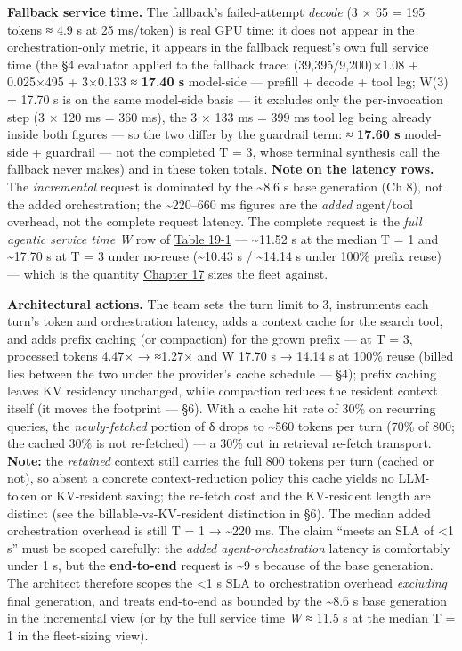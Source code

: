 \textbf{Fallback service time.} The fallback's failed-attempt
\emph{decode} (3 × 65 = 195 tokens ≈ 4.9 s at 25 ms/token) is real GPU
time: it does not appear in the orchestration-only metric, it appears in
the fallback request's own full service time (the §4 evaluator applied
to the fallback trace: (39,395/9,200)×1.08 + 0.025×495 + 3×0.133 ≈
\textbf{17.40 s} model-side --- prefill + decode + tool leg; W(3) =
17.70 s is on the same model-side basis --- it excludes only the
per-invocation step (3 × 120 ms = 360 ms), the 3 × 133 ms = 399 ms tool
leg being already inside both figures --- so the two differ by the
guardrail term: ≈ \textbf{17.60 s} model-side + guardrail --- not the
completed T = 3, whose terminal synthesis call the fallback never makes)
and in these token totals. \textbf{Note on the latency rows.} The
\emph{incremental} request is dominated by the \textasciitilde8.6 s base
generation (Ch 8), not the added orchestration; the
\textasciitilde220--660 ms figures are the \emph{added} agent/tool
overhead, not the complete request latency. The complete request is the
\emph{full agentic service time W} row of \hyperref[tab:19.1]{Table 19-1} ---
\textasciitilde11.52 s at the median T = 1 and \textasciitilde17.70 s at
T = 3 under no-reuse (\textasciitilde10.43 s / \textasciitilde14.14 s
under 100\% prefix reuse) --- which is the quantity \hyperref[chap:17]{Chapter 17} sizes the
fleet against.

\textbf{Architectural actions.} The team sets the turn limit to 3,
instruments each turn's token and orchestration latency, adds a context
cache for the search tool, and adds prefix caching (or compaction) for
the grown prefix --- at T = 3, processed tokens 4.47× → ≈1.27× and W
17.70 s → 14.14 s at 100\% reuse (billed lies between the two under the
provider's cache schedule --- §4); prefix caching leaves KV residency
unchanged, while compaction reduces the resident context itself (it
moves the footprint --- §6). With a cache hit rate of 30\% on recurring
queries, the \emph{newly-fetched} portion of δ drops to
\textasciitilde560 tokens per turn (70\% of 800; the cached 30\% is not
re-fetched) --- a 30\% cut in retrieval re-fetch transport.
\textbf{Note:} the \emph{retained} context still carries the full 800
tokens per turn (cached or not), so absent a concrete context-reduction
policy this cache yields no LLM-token or KV-resident saving; the
re-fetch cost and the KV-resident length are distinct (see the
billable-vs-KV-resident distinction in §6). The median added
orchestration overhead is still T = 1 → \textasciitilde220 ms. The claim
``meets an SLA of \textless1 s'' must be scoped carefully: the
\emph{added agent-orchestration} latency is comfortably under 1 s, but
the \textbf{end-to-end} request is \textasciitilde9 s because of the
base generation. The architect therefore scopes the \textless1 s SLA to
orchestration overhead \emph{excluding} final generation, and treats
end-to-end as bounded by the \textasciitilde8.6 s base generation in the
incremental view (or by the full service time \emph{W} ≈ 11.5 s at the
median T = 1 in the fleet-sizing view).

